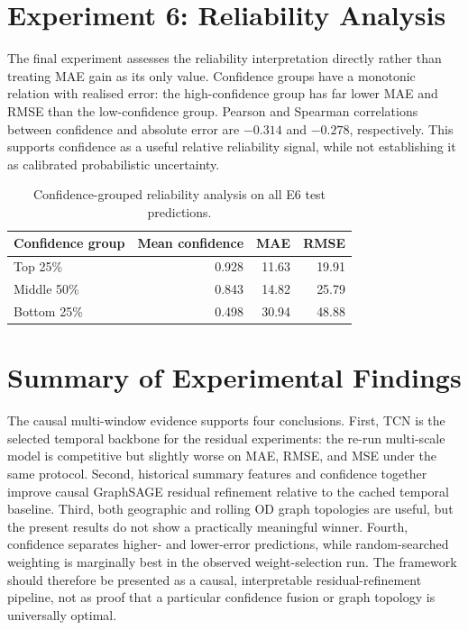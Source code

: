 \documentclass[12pt,a4paper]{report}
\begin{document}
	\section{Experiment 6: Reliability Analysis}
	
	The final experiment assesses the reliability interpretation directly rather than treating MAE gain as its only value. Confidence groups have a monotonic relation with realised error: the high-confidence group has far lower MAE and RMSE than the low-confidence group. Pearson and Spearman correlations between confidence and absolute error are $-0.314$ and $-0.278$, respectively. This supports confidence as a useful relative reliability signal, while not establishing it as calibrated probabilistic uncertainty.
	
	\begin{table}[H]
	    \centering
	    \caption{Confidence-grouped reliability analysis on all E6 test predictions.}
	    \label{tab:causal-reliability}
	    \begin{tabular}{lrrr}
	        \toprule
	        Confidence group & Mean confidence & MAE & RMSE \\
	        \midrule
	        Top 25\% & 0.928 & 11.63 & 19.91 \\
	        Middle 50\% & 0.843 & 14.82 & 25.79 \\
	        Bottom 25\% & 0.498 & 30.94 & 48.88 \\
	        \bottomrule
	    \end{tabular}
	\end{table}
	
	\section{Summary of Experimental Findings}
	
The causal multi-window evidence supports four conclusions. First, TCN is the selected temporal backbone for the residual experiments: the re-run multi-scale model is competitive but slightly worse on MAE, RMSE, and MSE under the same protocol. Second, historical summary features and confidence together improve causal GraphSAGE residual refinement relative to the cached temporal baseline. Third, both geographic and rolling OD graph topologies are useful, but the present results do not show a practically meaningful winner. Fourth, confidence separates higher- and lower-error predictions, while random-searched weighting is marginally best in the observed weight-selection run. The framework should therefore be presented as a causal, interpretable residual-refinement pipeline, not as proof that a particular confidence fusion or graph topology is universally optimal.
	
\end{document}
